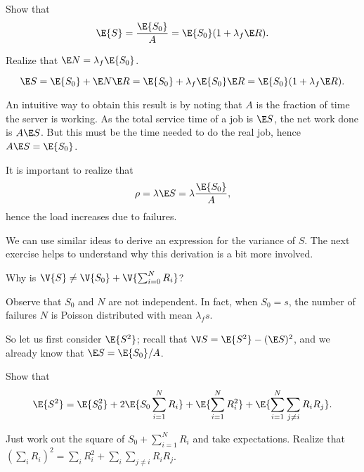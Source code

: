 \begin{exercise}[\faFlask]
  Show that 
  \begin{equation*}
\E{S} = \frac{\E{S_0}} A = \E{S_0} (1+\lambda_f \E R).
  \end{equation*}
  \begin{hint}
    Realize that $\E N = \lambda_f \E{S_0}$.
  \end{hint}
  \begin{solution}
    \begin{equation*}
      \E S = \E{S_0} + \E N \E R = \E{S_0} +  \lambda_f \E{S_0} \E R= \E{S_0}(1+\lambda_f \E R).
    \end{equation*}
  \end{solution}
\end{exercise}
An intuitive way to obtain this result is by noting that $A$ is the fraction of time the server is working. As the total service time of a job is $\E S$, the net work done is $ A\E S$. But this must be the time needed to do the real job, hence $A \E S = \E{S_0}$.  

It is important to realize that 
\begin{equation*}
\rho = \lambda \E S = \lambda \frac{\E{S_0}}A,
\end{equation*}
hence the load increases due to failures. 


We can use similar ideas to derive an expression for the variance of $S$. The next exercise helps to  understand why this derivation is a bit more involved.
\begin{exercise}[\faFlask]
  Why is $\V{S} \neq \V{S_0} + \V{\sum_{i=0}^N R_i}$?
  \begin{solution}
    Observe that $S_0$ and $N$ are not independent. In fact, when $S_0=s$, the number of failures $N$ is Poisson distributed with mean $\lambda_f s$. 
  \end{solution}
\end{exercise}

So let us first consider $\E{S^2}$; recall that $\V S = \E{S^2} - (\E S)^2$, and we already know that $\E S = \E{S_0}/A$. 

\begin{exercise}[\faFlask]
Show that 
\begin{equation*}
  \E{S^2} = \E{S_0^2} + 2\E{S_0 \sum_{i=1}^N R_i} + \E{\sum_{i=1}^N R_i^2} + \E{\sum_{i=1}^N \sum_{j\neq i} R_i R_j}.
\end{equation*}
\begin{solution}
  Just work out the square of $S_0+\sum_{i=1}^N R_i$ and take expectations. Realize that $(\sum_i R_i)^2 = \sum_i R_i^2 + \sum_i\sum_{j\neq i} R_i R_j$.  
\end{solution}
\end{exercise}

